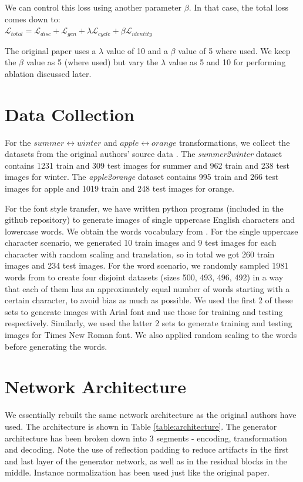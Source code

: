 \documentclass[10pt,twocolumn,letterpaper]{article}
\begin{document}
We can control this loss using another parameter $\beta$. In that case, the total loss comes down to:\\

$\mathcal{L}_{total} = \mathcal{L}_{disc} + \mathcal{L}_{gen} + \lambda\mathcal{L}_{cycle} + \beta\mathcal{L}_{identity}$

The original paper uses a $\lambda$ value of 10 and a $\beta$ value of 5 where used.
We keep the $\beta$ value as 5 (where used) but vary the $\lambda$ value as 5 and 10 for performing ablation discussed later.

\section{Data Collection}

For the $summer \leftrightarrow winter$ and $apple \leftrightarrow orange$ transformations, we collect 
the datasets from the original authors' source data \cite{data1}. The \textit{summer2winter} dataset contains 1231 train and 309 test images for summer and 962 train and 238 test images for winter. The \textit{apple2orange} dataset contains 995 train and 266 test images for apple and 1019 train and 248 test images for orange.

For the font style transfer, we have written python programs (included in the github repository) to generate images of single uppercase English characters and lowercase words. We obtain the words vocabulary from \cite{data2}. For the single uppercase character scenario, we generated 10 train images and 9 test images for each character with random scaling and translation, so in total we got 260 train images and 234 test images. For the word scenario, we randomly sampled 1981 words from \cite{data2} to create four disjoint datasets (sizes 500, 493, 496, 492) in a way that each of them has an approximately equal number of words starting with a certain character, to avoid bias as much as possible. We used the first 2 of these sets to generate images with Arial font and use those for training and testing respectively. Similarly, we used the latter 2 sets to generate training and testing images for Times New Roman font. We also applied random scaling to the words before generating the words. 

\section{Network Architecture}
We essentially rebuilt the same network architecture as the original authors 
\cite{cyclegan} have used. The architecture is shown in Table \ref{table:architecture}.
The generator architecture has been broken down into 3 segments - encoding, transformation
and decoding. Note the use of reflection padding to reduce artifacts in the first and last layer of the
generator network, as well as in the residual blocks in the middle. Instance normalization has been used
just like the original paper.
\end{document}
